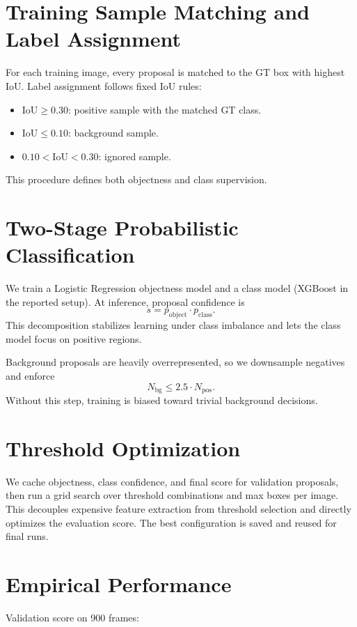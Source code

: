 \documentclass[11pt]{article}
\begin{document}
\section{Training Sample Matching and Label Assignment}

For each training image, every proposal is matched to the GT box with highest IoU. Label assignment follows fixed IoU rules:
\begin{itemize}
    \item $\text{IoU} \ge 0.30$: positive sample with the matched GT class.
    \item $\text{IoU} \le 0.10$: background sample.
    \item $0.10 < \text{IoU} < 0.30$: ignored sample.
\end{itemize}
This procedure defines both objectness and class supervision.

\section{Two-Stage Probabilistic Classification}

We train a Logistic Regression objectness model and a class model (XGBoost in the reported setup). At inference, proposal confidence is
\[
s = p_{\text{object}} \cdot p_{\text{class}}.
\]
This decomposition stabilizes learning under class imbalance and lets the class model focus on positive regions.

Background proposals are heavily overrepresented, so we downsample negatives and enforce
\[
N_{\text{bg}} \le 2.5 \cdot N_{\text{pos}}.
\]
Without this step, training is biased toward trivial background decisions.

\section{Threshold Optimization}

We cache objectness, class confidence, and final score for validation proposals, then run a grid search over threshold combinations and max boxes per image. This decouples expensive feature extraction from threshold selection and directly optimizes the evaluation score. The best configuration is saved and reused for final runs.

\section{Empirical Performance}

Validation score on 900 frames:
\end{document}

